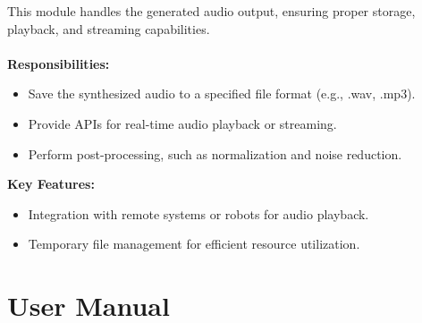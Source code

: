 \documentclass{CSSRforAfrica}
\begin{document}
This module handles the generated audio output, ensuring proper storage, playback, and streaming capabilities.
\\~\\
\textbf{Responsibilities:}
\begin{itemize}
    \item Save the synthesized audio to a specified file format (e.g., .wav, .mp3).
    \item Provide APIs for real-time audio playback or streaming.
    \item Perform post-processing, such as normalization and noise reduction.
\end{itemize}

\textbf{Key Features:}
\begin{itemize}
    \item Integration with remote systems or robots for audio playback.
    \item Temporary file management for efficient resource utilization.
\end{itemize}


\newpage

\section{User Manual}



\end{document}
